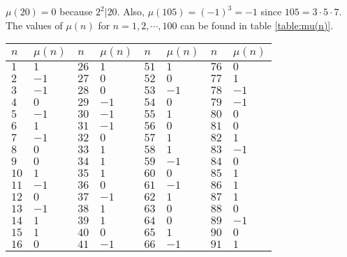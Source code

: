 \documentclass[12pt]{subfile}
\begin{document}
		\begin{example}
			$\mu(20)=0$ because $2^2|20$. Also, $\mu(105)=(-1)^3=-1$ since $105=3\cdot5 \cdot 7$. The values of $\mu(n)$ for $n=1,2,\cdots,100$ can be found in table \ref{table:mu(n)}.



			\begin{table}
				\centering
				\begin{tabular}{ | l | l | l | l | l | l | l | l | }
					\hline
					$n$  &
					     $\mu(n)$&
					               $n$  &
					                   $\mu(n)$&
					                            $n$   &
					                                 $\mu(n)$&
					                                            $n$  &
					                                                  $\mu(n)$ \\ \hline
					$1$  & $1$   & $26$ & $1$  & $51$ & $1$  & $76$  & $0$     \\ \hline
					$2$  & $-1$  & $27$ & $0$  & $52$ & $0$  & $77$  & $1$     \\ \hline
					$3$  & $-1$  & $28$ & $0$  & $53$ & $-1$ & $78$  & $-1$    \\ \hline
					$4$  & $0$   & $29$ & $-1$ & $54$ & $0$  & $79$  & $-1$    \\ \hline
					$5$  & $-1$  & $30$ & $-1$ & $55$ & $1$  & $80$  & $0$     \\ \hline
					$6$  & $1$   & $31$ & $-1$ & $56$ & $0$  & $81$  & $0$     \\ \hline
					$7$  & $-1$  & $32$ & $0$  & $57$ & $1$  & $82$  & $1$     \\ \hline
					$8$  & $0$   & $33$ & $1$  & $58$ & $1$  & $83$  & $-1$    \\ \hline
					$9$  & $0$   & $34$ & $1$  & $59$ & $-1$ & $84$  & $0$     \\ \hline
					$10$ & $1$   & $35$ & $1$  & $60$ & $0$  & $85$  & $1$     \\ \hline
					$11$ & $-1$  & $36$ & $0$  & $61$ & $-1$ & $86$  & $1$     \\ \hline
					$12$ & $0$   & $37$ & $-1$ & $62$ & $1$  & $87$  & $1$     \\ \hline
					$13$ & $-1$  & $38$ & $1$  & $63$ & $0$  & $88$  & $0$     \\ \hline
					$14$ & $1$   & $39$ & $1$  & $64$ & $0$  & $89$  & $-1$    \\ \hline
					$15$ & $1$   & $40$ & $0$  & $65$ & $1$  & $90$  & $0$     \\ \hline
					$16$ & $0$   & $41$ & $-1$ & $66$ & $-1$ & $91$  & $1$     \\ \hline

\end{tabular}
\end{table}
\end{example}
\end{document}
